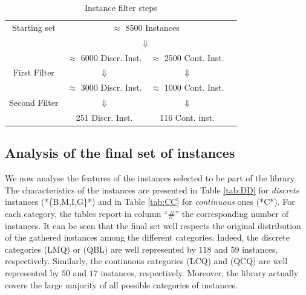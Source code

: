 \begin{center}
\begin{table}[]
 \centering
 \setlength{\tabcolsep}{5pt}
\begin{tabular}{cccc}
Starting set& \multicolumn{ 2}{c}{ $\approx$ 8500 Instances }& \\
& \multicolumn{ 2}{c}{$\Downarrow$}& \\
& $\approx$ 6000 Discr. Inst.  & $\approx$ 2500 Cont. Inst. & \\
First Filter  & $\Downarrow$  & $\Downarrow$ & \\
 & $\approx$ 3000 Discr. Inst.  & $\approx$ 1000 Cont. Inst. & \\
Second Filter & $\Downarrow$  & $\Downarrow$  & \\
  & 251 Discr. Inst.  & 116  Cont. inst. & \\
\end{tabular}
\caption{Instance filter steps} \label{tab:filters}
\end{table}
\end{center}

\subsection{Analysis of the final set of instances}\label{subsec:final set}

We now analyse the features of the instances selected to be part of the
library. The characteristics of the instances are presented in Table
\ref{tab:DD} for \emph{discrete} instances (*\{B,M,I,G\}*) and in Table
\ref{tab:CC} for \emph{continuous} ones (*C*). For each category, the tables
report in column ``$\#$'' the corresponding number of instances. It can be seen
that the final set well respects the original distribution of the gathered
instances among the different categories. Indeed, the discrete categories
(LMQ) or (QBL) are well represented by $118$ and $59$ instances,
respectively. Similarly, the continuous categories (LCQ) and (QCQ) are well
represented by $50$ and $17$ instances, respectively. Moreover, the library
actually covers the large majority of all possible categories of instances.

